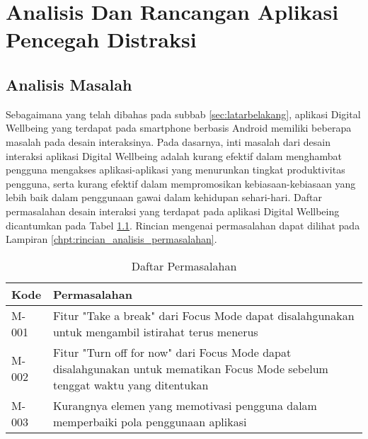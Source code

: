 \chapter{Analisis Dan Rancangan Aplikasi Pencegah Distraksi}



\section{Analisis Masalah}
\label{sec:analisis_masalah}

Sebagaimana yang telah dibahas pada subbab \ref{sec:latarbelakang}, aplikasi Digital Wellbeing yang terdapat pada smartphone berbasis Android memiliki beberapa masalah pada desain interaksinya. Pada dasarnya, inti masalah dari desain interaksi aplikasi Digital Wellbeing adalah kurang efektif dalam menghambat pengguna mengakses aplikasi-aplikasi yang menurunkan tingkat produktivitas pengguna, serta kurang efektif dalam mempromosikan kebiasaan-kebiasaan yang lebih baik dalam penggunaan gawai dalam kehidupan sehari-hari. Daftar permasalahan desain interaksi yang terdapat pada aplikasi Digital Wellbeing dicantumkan pada Tabel \ref{tab:daftar_permasalahan}. Rincian mengenai permasalahan dapat dilihat pada Lampiran \ref{chpt:rincian_analisis_permasalahan}.

\begin{table}[ht]
  \centering
  \fontsize{10}{12}
  \caption{Daftar Permasalahan}
  \label{tab:daftar_permasalahan}
  \vspace{0.2cm}
  \begin{tabular}{|p{}|p{}|}
  \hline
  Kode  & Permasalahan                                                                                                                    \\ \hline
  M-001 & Fitur "Take a break" dari Focus Mode dapat disalahgunakan untuk mengambil istirahat terus menerus                               \\ \hline
  M-002 & Fitur "Turn off for now" dari Focus Mode dapat disalahgunakan untuk mematikan Focus Mode sebelum tenggat waktu yang ditentukan  \\ \hline
  M-003 & Kurangnya elemen yang memotivasi pengguna dalam memperbaiki pola penggunaan aplikasi                                            \\ \hline
  \end{tabular}
\end{table}


